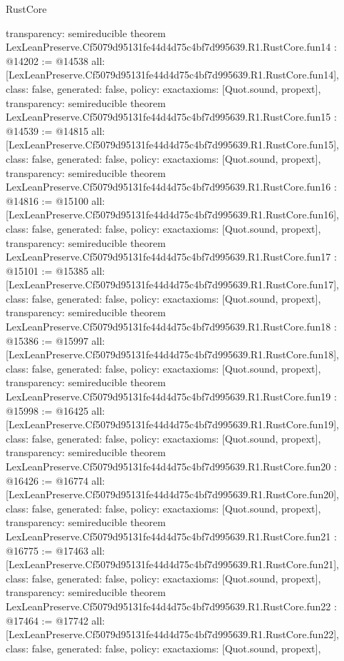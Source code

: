 \begin{lexlean}{RustCore}
\begin{coremodule}
{  transparency: semireducible
}
theorem LexLeanPreserve.Cf5079d95131fe44d4d75c4bf7d995639.R1.RustCore.fun14 : @14202 := @14538 {
  all: [LexLeanPreserve.Cf5079d95131fe44d4d75c4bf7d995639.R1.RustCore.fun14],
  class: false,
  generated: false,
  policy: exact{axioms: [Quot.sound, propext]},
  transparency: semireducible
}
theorem LexLeanPreserve.Cf5079d95131fe44d4d75c4bf7d995639.R1.RustCore.fun15 : @14539 := @14815 {
  all: [LexLeanPreserve.Cf5079d95131fe44d4d75c4bf7d995639.R1.RustCore.fun15],
  class: false,
  generated: false,
  policy: exact{axioms: [Quot.sound, propext]},
  transparency: semireducible
}
theorem LexLeanPreserve.Cf5079d95131fe44d4d75c4bf7d995639.R1.RustCore.fun16 : @14816 := @15100 {
  all: [LexLeanPreserve.Cf5079d95131fe44d4d75c4bf7d995639.R1.RustCore.fun16],
  class: false,
  generated: false,
  policy: exact{axioms: [Quot.sound, propext]},
  transparency: semireducible
}
theorem LexLeanPreserve.Cf5079d95131fe44d4d75c4bf7d995639.R1.RustCore.fun17 : @15101 := @15385 {
  all: [LexLeanPreserve.Cf5079d95131fe44d4d75c4bf7d995639.R1.RustCore.fun17],
  class: false,
  generated: false,
  policy: exact{axioms: [Quot.sound, propext]},
  transparency: semireducible
}
theorem LexLeanPreserve.Cf5079d95131fe44d4d75c4bf7d995639.R1.RustCore.fun18 : @15386 := @15997 {
  all: [LexLeanPreserve.Cf5079d95131fe44d4d75c4bf7d995639.R1.RustCore.fun18],
  class: false,
  generated: false,
  policy: exact{axioms: [Quot.sound, propext]},
  transparency: semireducible
}
theorem LexLeanPreserve.Cf5079d95131fe44d4d75c4bf7d995639.R1.RustCore.fun19 : @15998 := @16425 {
  all: [LexLeanPreserve.Cf5079d95131fe44d4d75c4bf7d995639.R1.RustCore.fun19],
  class: false,
  generated: false,
  policy: exact{axioms: [Quot.sound, propext]},
  transparency: semireducible
}
theorem LexLeanPreserve.Cf5079d95131fe44d4d75c4bf7d995639.R1.RustCore.fun20 : @16426 := @16774 {
  all: [LexLeanPreserve.Cf5079d95131fe44d4d75c4bf7d995639.R1.RustCore.fun20],
  class: false,
  generated: false,
  policy: exact{axioms: [Quot.sound, propext]},
  transparency: semireducible
}
theorem LexLeanPreserve.Cf5079d95131fe44d4d75c4bf7d995639.R1.RustCore.fun21 : @16775 := @17463 {
  all: [LexLeanPreserve.Cf5079d95131fe44d4d75c4bf7d995639.R1.RustCore.fun21],
  class: false,
  generated: false,
  policy: exact{axioms: [Quot.sound, propext]},
  transparency: semireducible
}
theorem LexLeanPreserve.Cf5079d95131fe44d4d75c4bf7d995639.R1.RustCore.fun22 : @17464 := @17742 {
  all: [LexLeanPreserve.Cf5079d95131fe44d4d75c4bf7d995639.R1.RustCore.fun22],
  class: false,
  generated: false,
  policy: exact{axioms: [Quot.sound, propext]},
}
\end{coremodule}
\end{lexlean}
